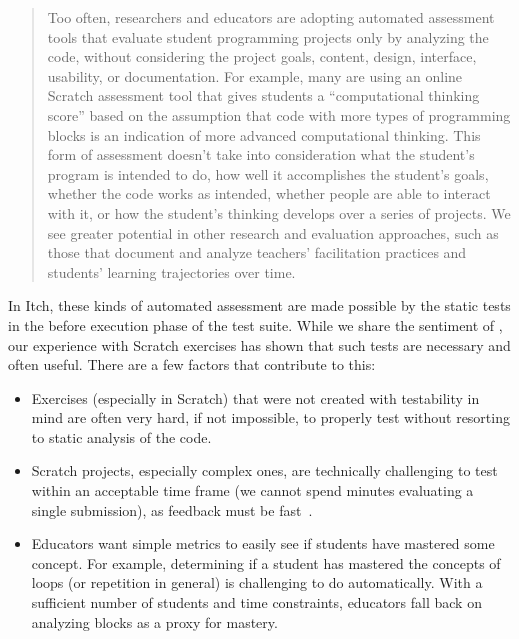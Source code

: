 \documentclass[../main]{subfiles}
\begin{document}
\begin{quotation}
    Too often, researchers and educators are adopting automated assessment tools that evaluate student programming projects only by analyzing the code, without considering the project goals, content, design, interface, usability, or documentation.
    For example, many are using an online Scratch assessment tool that gives students a ``computational thinking score'' based on the assumption that code with more types of programming blocks is an indication of more advanced computational thinking.
    This form of assessment doesn't take into consideration what the student's program is intended to do, how well it accomplishes the student’s goals, whether the code works as intended, whether people are able to interact with it, or how the student’s thinking develops over a series of projects.
    We see greater potential in other research and evaluation approaches, such as those that document and analyze teachers’ facilitation practices and students’ learning trajectories over time.
\end{quotation}

In Itch, these kinds of automated assessment are made possible by the static tests in the before execution phase of the test suite.
While we share the sentiment of \citeauthor{resnickCodingCrossroads2020}, our experience with Scratch exercises has shown that such tests are necessary and often useful.
There are a few factors that contribute to this:

\begin{itemize}
    \item Exercises (especially in Scratch) that were not created with testability in mind are often very hard, if not impossible, to properly test without resorting to static analysis of the code.
    \item Scratch projects, especially complex ones, are technically challenging to test within an acceptable time frame (we cannot spend minutes evaluating a single submission), as feedback must be fast~\autocite{sarsaSpeedingAutomatedAssessment2022}.
    \item Educators want simple metrics to easily see if students have mastered some concept.
          For example, determining if a student has mastered the concepts of loops (or repetition in general) is challenging to do automatically.
          With a sufficient number of students and time constraints, educators fall back on analyzing blocks as a proxy for mastery.
\end{itemize}
\end{document}
